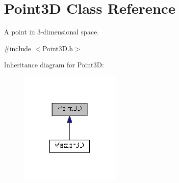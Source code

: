 \hypertarget{class_point3_d}{\section{Point3\+D Class Reference}
\label{class_point3_d}
}


A point in 3-\/dimensional space.  




{\ttfamily \#include $<$Point3\+D.\+h$>$}



Inheritance diagram for Point3\+D\+:\nopagebreak
\begin{figure}[H]
\begin{center}
\leavevmode
\includegraphics[width=141pt]{class_point3_d__inherit__graph}
\end{center}
\end{figure}
